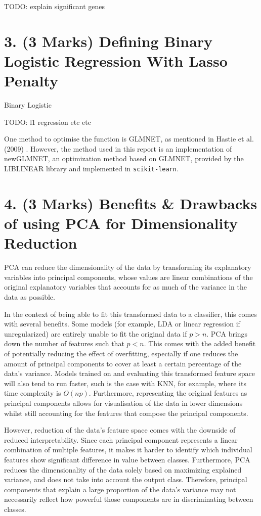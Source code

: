 \documentclass[twocolumn]{article}
\begin{document}
TODO: explain significant genes\\

\section{3. (3 Marks) Defining Binary Logistic Regression With Lasso Penalty}

Binary Logistic

TODO: l1 regression etc etc

One method to optimise the function is GLMNET, as mentioned in Hastie et al. (2009) \cite{HastieTrevor2009EoSL}. However, the method used in this report is an implementation of newGLMNET, an optimization method based on GLMNET, provided by the LIBLINEAR library and implemented in \texttt{scikit-learn}.

\section{4. (3 Marks) Benefits \& Drawbacks of using PCA for Dimensionality Reduction}
PCA can reduce the dimensionality of the data by transforming its explanatory variables into principal components, whose values are linear combinations of the original explanatory variables that accounts for as much of the variance in the data as possible. 

In the context of being able to fit this transformed data to a classifier, this comes with several benefits. Some models (for example, LDA or linear regression if unregularized) are entirely unable to fit the original data if $p>n$. PCA brings down the number of features such that $p<n$. This comes with the added benefit of potentially reducing the effect of overfitting, especially if one reduces the amount of principal components to cover at least a certain percentage of the data's variance. Models trained on and evaluating this transformed feature space will also tend to run faster, such is the case with KNN, for example, where its time complexity is $O(np)$. Furthermore, representing the original features as principal components allows for visualisation of the data in lower dimensions whilst still accounting for the features that compose the principal components.

However, reduction of the data's feature space comes with the downside of reduced interpretability. Since each principal component represents a linear combination of multiple features, it makes it harder to identify which individual features show significant difference in value between classes. Furthermore, PCA reduces the dimensionality of the data solely based on maximizing explained variance, and does not take into account the output class. Therefore, principal components that explain a large proportion of the data's variance may not necessarily reflect how powerful those components are in discriminating between classes.
\end{document}
